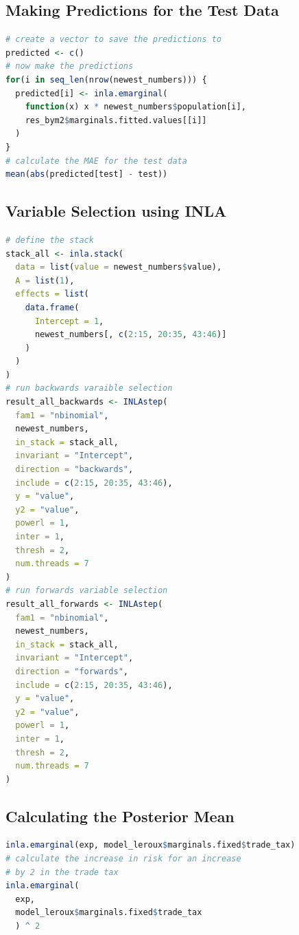 \subsection{Making Predictions for the Test Data}
\begin{lstlisting}[caption={The code for making predictions in INLA.}, label={codePrediction}, language=R]
# create a vector to save the predictions to
predicted <- c()
# now make the predictions
for(i in seq_len(nrow(newest_numbers))) {
  predicted[i] <- inla.emarginal(
    function(x) x * newest_numbers$population[i],
    res_bym2$marginals.fitted.values[[i]]
  )
}
# calculate the MAE for the test data
mean(abs(predicted[test] - test))

\end{lstlisting}
\subsection{Variable Selection using INLA}
\begin{lstlisting}[caption={The code for variable selection in INLA.}, label={codeSelection}, language=R]
# define the stack
stack_all <- inla.stack(
  data = list(value = newest_numbers$value),
  A = list(1),
  effects = list(
    data.frame(
      Intercept = 1,
      newest_numbers[, c(2:15, 20:35, 43:46)]
    )
  )
)
# run backwards varaible selection
result_all_backwards <- INLAstep(
  fam1 = "nbinomial",
  newest_numbers,
  in_stack = stack_all,
  invariant = "Intercept",
  direction = "backwards",
  include = c(2:15, 20:35, 43:46),
  y = "value",
  y2 = "value",
  powerl = 1,
  inter = 1,
  thresh = 2,
  num.threads = 7
)
# run forwards variable selection
result_all_forwards <- INLAstep(
  fam1 = "nbinomial",
  newest_numbers,
  in_stack = stack_all,
  invariant = "Intercept",
  direction = "forwards",
  include = c(2:15, 20:35, 43:46),
  y = "value",
  y2 = "value",
  powerl = 1,
  inter = 1,
  thresh = 2,
  num.threads = 7
)
\end{lstlisting}
\subsection{Calculating the Posterior Mean}
\begin{lstlisting}[caption={Calculating the posterior mean of a coefficent.}, label={codePosteriorMean}, language=R]
inla.emarginal(exp, model_leroux$marginals.fixed$trade_tax)
# calculate the increase in risk for an increase 
# by 2 in the trade tax
inla.emarginal(
  exp,
  model_leroux$marginals.fixed$trade_tax
  ) ^ 2
\end{lstlisting}
